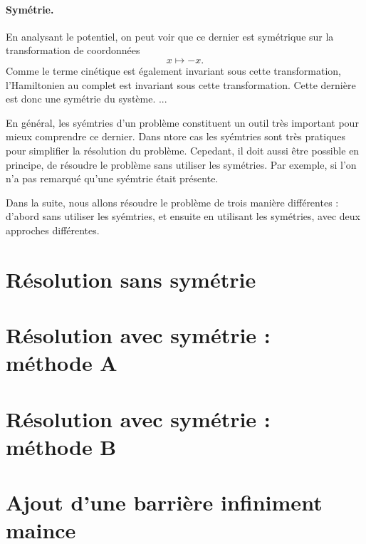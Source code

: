 \documentclass[11pt,a4paper,oneside]{article}
\begin{document}
\paragraph*{Symétrie.} En analysant le potentiel, on peut voir que ce dernier est symétrique sur la transformation de coordonnées
\begin{equation}
    x\mapsto-x.
\end{equation}
Comme le terme cinétique est également invariant sous cette transformation, l'Hamiltonien au complet est invariant sous cette transformation. Cette dernière est donc une symétrie du système.
... 

En général, les syémtries d'un problème constituent un outil très important pour mieux comprendre ce dernier. Dans ntore cas les syémtries sont très pratiques pour simplifier la résolution du problème. Cepedant, il doit aussi être possible en principe, de résoudre le problème sans utiliser les symétries. Par exemple, si l'on n'a pas remarqué qu'une syémtrie était présente.

Dans la suite, nous allons résoudre le problème de trois manière différentes : d'abord sans utiliser les syémtries, et ensuite en utilisant les symétries, avec deux approches différentes.

\section{Résolution sans symétrie}

\section{Résolution avec symétrie : méthode A}

\section{Résolution avec symétrie : méthode B}

\section{Ajout d'une barrière infiniment maince}
\end{document}
